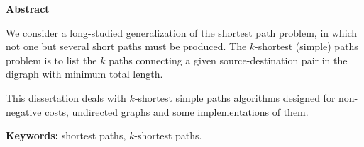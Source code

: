 
\centerline{\bf Abstract}

\vspace{0.4cm}

\noindent

We consider a long-studied generalization of the shortest path problem,
in which not one but several short paths must be produced.
The $k$-shortest (simple) paths problem is to list the $k$ paths 
connecting a given source-destination pair in the digraph with minimum total length.

This dissertation deals with $k$-shortest simple paths algorithms 
designed for non-negative costs, undirected graphs and 
some implementations of them.

\noindent \textbf{Keywords:} shortest paths, $k$-shortest paths.
